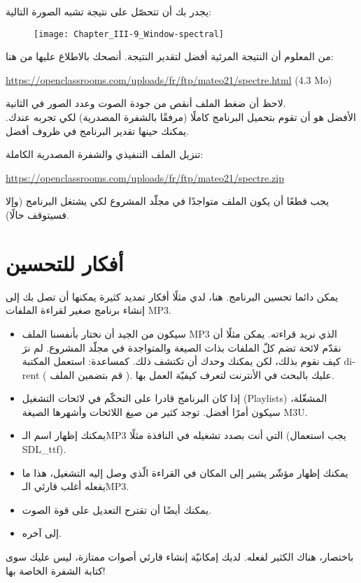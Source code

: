 يجدر بك أن تتحصّل على نتيجة تشبه الصورة التالية:

\begin{figure}[H]
	\centering
	\texttt{[image: Chapter\_III-9\_Window-spectral]}
\end{figure}

من المعلوم أن النتيجة المرئية أفضل لتقدير النتيجة. أنصحك بالاطلاع عليها من هنا:

\textenglish{\url{https://openclassrooms.com/uploads/fr/ftp/mateo21/spectre.html} (4.3 Mo)}

لاحظ أن ضغط الملف أنقص من جودة الصوت وعدد الصور في الثانية.\\
الأفضل هو أن تقوم بتحميل البرنامج كاملًا (مرفقًا بالشفرة المصدرية) لكي تجربه عندك. يمكنك حينها تقدير البرنامج في ظروف أفضل.

تنزيل الملف التنفيذي والشفرة المصدرية الكاملة:

\url{https://openclassrooms.com/uploads/fr/ftp/mateo21/spectre.zip}

\begin{critical}
يجب قطعًا أن يكون الملف
متواجدًا في مجلّد المشروع لكي يشتغل البرنامج (وإلا فسيتوقف حالًا).
\end{critical}

\section*{أفكار للتحسين}

يمكن دائما تحسين البرنامج. هنا، لدي مثلًا أفكار تمديد كثيرة يمكنها أن تصل بك إلى إنشاء برنامج صغير لقراءة الملفات
\textenglish{MP3}.

\begin{itemize}
	\item سيكون من الجيد أن نختار بأنفسنا الملف
	\textenglish{MP3}
	الذي نريد قراءته. يمكن مثلًا أن نقدّم لائحة تضم كلّ الملفات بذات الصيغة والمتواجدة في مجلّد المشروع. لم نرَ كيف نقوم بذلك، لكن يمكنك وحدك أن تكتشف ذلك. كمساعدة: استعمل المكتبة
	\textenglish{dirent}
	( قم بتضمين الملف 
	).
	عليك بالبحث في الأنترنت لتعرف كيفيّة العمل بها.
	\item إذا كان البرنامج قادرا على التحكّم في لائحات التشغيل
	(\textenglish{Playlists})
	المشغّلة، سيكون أمرًا أفضل. توجد كثير من صيغ اللائحات وأشهرها الصيغة
	\textenglish{M3U}.
	\item يمكنك إظهار اسم الـ\textenglish{MP3}
	التي أنت بصدد تشغيله في النافذة مثلًا (يجب استعمال
	\textenglish{SDL\_ttf}).
	\item يمكنك إظهار مؤشّر يشير إلى المكان في القراءة الّذي وصل إليه التشغيل، هذا ما يفعله أغلب قارئي الـ\textenglish{MP3}.
	\item يمكنك أيضًا أن تقترح التعديل على قوة الصوت.
	\item إلى آخره.
\end{itemize}

باختصار، هناك الكثير لفعله. لديك إمكانيّة إنشاء قارئي أصوات ممتازة، ليس عليك سوى كتابة الشفرة الخاصة بها!

